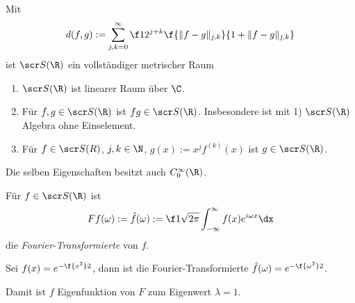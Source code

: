 \begin{nt} \label{4.3}
	Mit
	\[
		d(f,g) := \sum_{j,k = 0}^\infty \f 1{2^{j+k}} \f {\|f-g\|_{j,k}}{1+ \|f-g\|_{j,k}}
	\]
	ist $\scr S(\R)$ ein vollständiger metrischer Raum
\end{nt}

\begin{nt}[Eigenschaften] \label{4.4}
	\begin{enumerate}[1)]
		\item
			$\scr S(\R)$ ist linearer Raum über $\C$.
		\item
			Für $f,g \in \scr S (\R)$ ist $fg \in \scr S(\R)$.
			Insbesondere ist mit 1) $\scr S(\R)$ Algebra ohne Einselement.
		\item
			Für $f \in \scr S(R)$, $j,k \in \N$, $g(x) := x^j f^{(k)}(x)$ ist $g \in \scr S(\R)$.
	\end{enumerate}
	Die selben Eigenschaften besitzt auch $C_0^\infty(\R)$.
\end{nt}

\begin{df} \label{4.5}
	Für $f \in \scr S (\R)$ ist
	\[
		Ff(\omega) := \hat f(\omega) := \f 1{\sqrt{2\pi}} \int_{-\infty}^\infty f(x) e^{i\omega x} \dx
	\]
	die \emph{Fourier-Transformierte} von $f$.
\end{df}

\begin{ex} \label{4.6}
	Sei $f(x) = e^{-\f {x^2}2}$, dann ist die Fourier-Transformierte $\hat f(\omega) = e^{-\f {\omega^2}2}$.

	Damit ist $f$ Eigenfunktion von $F$ zum Eigenwert $\lambda = 1$.
\end{ex}

